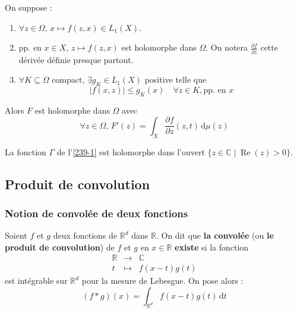   \begin{theorem}
    On suppose :
    \begin{enumerate}[label=(\roman*)]
      \item $\forall z \in \Omega$, $x \mapsto f(z,x) \in L_1(X)$.
      \item pp. en $x \in X$, $z \mapsto f(z,x)$ est holomorphe dans $\Omega$. On notera $\frac{\partial f}{\partial z}$ cette dérivée définie presque partout.
      \item $\forall K \subseteq \Omega$ compact, $\exists g_K \in L_1(X)$ positive telle que
      \[ \left| f(x,z) \right| \leq g_K(x) \quad \forall z \in K, \text{pp. en } x \]
    \end{enumerate}
    Alors $F$ est holomorphe dans $\Omega$ avec
    \[ \forall z \in \Omega, \, F'(z) = \int_X \frac{\partial f}{\partial z}(z, t) \, \mathrm{d}\mu(z) \]
  \end{theorem}


  \begin{example}
    La fonction $\Gamma$ de l'\cref{239-1} est holomorphe dans l'ouvert $\{ z \in \mathbb{C} \mid \operatorname{Re}(z) > 0 \}$.
  \end{example}

  \subsection{Produit de convolution}

  \subsubsection{Notion de convolée de deux fonctions}


  \begin{definition}
    Soient $f$ et $g$ deux fonctions de $\mathbb{R}^d$ dans $\mathbb{R}$. On dit que \textbf{la convolée} (ou \textbf{le produit de convolution}) de $f$ et $g$ en $x \in \mathbb{R}$ \textbf{existe} si la fonction
    \[
    \begin{array}{ccc}
      \mathbb{R} &\rightarrow& \mathbb{C} \\
      t &\mapsto& f(x-t)g(t)
    \end{array}
    \]
    est intégrable sur $\mathbb{R}^d$ pour la mesure de Lebesgue. On pose alors :
    \[ (f * g)(x) = \int_{\mathbb{R}^d} f(x-t)g(t) \, \mathrm{d}t \]
  \end{definition}

